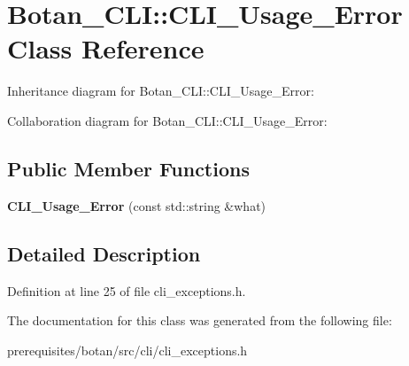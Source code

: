 \hypertarget{class_botan___c_l_i_1_1_c_l_i___usage___error}{}\section{Botan\+\_\+\+C\+LI\+:\+:C\+L\+I\+\_\+\+Usage\+\_\+\+Error Class Reference}
\label{class_botan___c_l_i_1_1_c_l_i___usage___error}


Inheritance diagram for Botan\+\_\+\+C\+LI\+:\+:C\+L\+I\+\_\+\+Usage\+\_\+\+Error\+:


Collaboration diagram for Botan\+\_\+\+C\+LI\+:\+:C\+L\+I\+\_\+\+Usage\+\_\+\+Error\+:
\subsection*{Public Member Functions}
\begin{DoxyCompactItemize}
\item 
\mbox{\label{class_botan___c_l_i_1_1_c_l_i___usage___error_aa80bc158817d6ca49ce7ac4ebb8760c7}} 
{\bfseries C\+L\+I\+\_\+\+Usage\+\_\+\+Error} (const std\+::string \&what)
\end{DoxyCompactItemize}


\subsection{Detailed Description}


Definition at line 25 of file cli\+\_\+exceptions.\+h.



The documentation for this class was generated from the following file\+:\begin{DoxyCompactItemize}
\item 
prerequisites/botan/src/cli/cli\+\_\+exceptions.\+h\end{DoxyCompactItemize}
